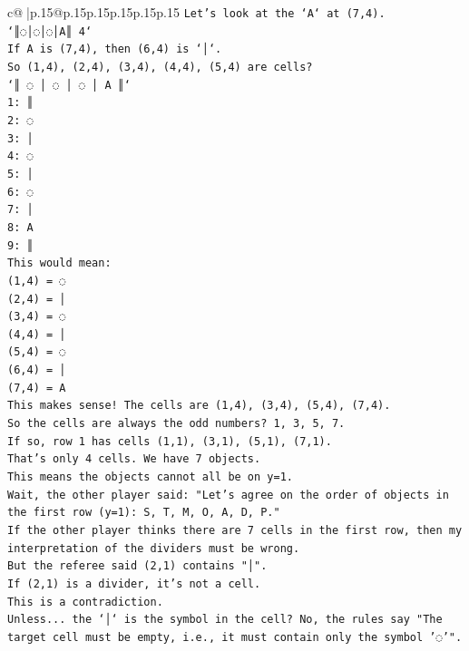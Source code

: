 \documentclass{article}
\begin{document}
{\begin{supertabular}{c@{$\;$}|p{.15\linewidth}@{}p{.15\linewidth}p{.15\linewidth}p{.15\linewidth}p{.15\linewidth}p{.15\linewidth}}
{{{\texttt{Let's look at the `A` at (7,4).} \\
\texttt{`║◌│◌│◌│A║ 4`} \\
\texttt{If A is (7,4), then (6,4) is `│`.} \\
\texttt{So (1,4), (2,4), (3,4), (4,4), (5,4) are cells?} \\
\texttt{`║ ◌ │ ◌ │ ◌ │ A ║`} \\
\texttt{1: ║} \\
\texttt{2: ◌} \\
\texttt{3: │} \\
\texttt{4: ◌} \\
\texttt{5: │} \\
\texttt{6: ◌} \\
\texttt{7: │} \\
\texttt{8: A} \\
\texttt{9: ║} \\
\texttt{This would mean:} \\
\texttt{(1,4) = ◌} \\
\texttt{(2,4) = │} \\
\texttt{(3,4) = ◌} \\
\texttt{(4,4) = │} \\
\texttt{(5,4) = ◌} \\
\texttt{(6,4) = │} \\
\texttt{(7,4) = A} \\
\texttt{This makes sense! The cells are (1,4), (3,4), (5,4), (7,4).} \\
\texttt{So the cells are always the odd numbers? 1, 3, 5, 7.} \\
\texttt{If so, row 1 has cells (1,1), (3,1), (5,1), (7,1).} \\
\texttt{That's only 4 cells. We have 7 objects.} \\
\texttt{This means the objects cannot all be on y=1.} \\
\texttt{Wait, the other player said: "Let's agree on the order of objects in the first row (y=1): S, T, M, O, A, D, P."} \\
\texttt{If the other player thinks there are 7 cells in the first row, then my interpretation of the dividers must be wrong.} \\
\texttt{But the referee said (2,1) contains "│".} \\
\texttt{If (2,1) is a divider, it's not a cell.} \\
\texttt{This is a contradiction.} \\
\texttt{Unless... the `│` is the symbol in the cell? No, the rules say "The target cell must be empty, i.e., it must contain only the symbol '◌'".} \\
}}}
\end{supertabular}}
\end{document}
